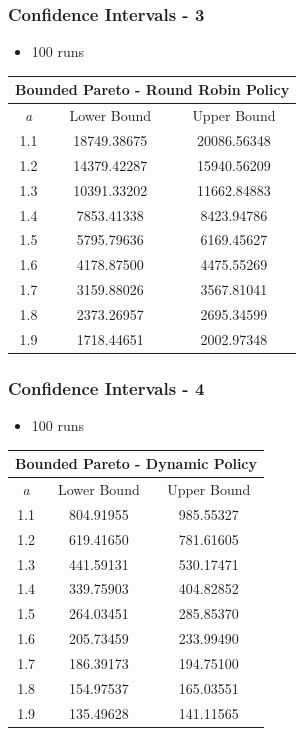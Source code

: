 \documentclass[red]{beamer}
\begin{document}
\begin{frame}
\frametitle{Confidence Intervals - 3}

\vspace{-.2cm}
\begin{itemize}
\item 100 runs
\end{itemize}
\vspace{.3cm}

\hspace*{1cm}
\begin{tabular}{|c|c|c|}
\hline
\multicolumn{3}{|c|}{Bounded Pareto - Round Robin Policy} \\
\hline
\textit{a} & Lower Bound & Upper Bound \\
\hline
1.1 & 18749.38675 & 20086.56348 \\
\hline
1.2 & 14379.42287 & 15940.56209 \\
\hline
1.3 & 10391.33202 & 11662.84883 \\
\hline
1.4 & 7853.41338	 & 8423.94786 \\
\hline
1.5 & 5795.79636	 & 6169.45627 \\
\hline
1.6 & 4178.87500	 & 4475.55269 \\
\hline
1.7 & 3159.88026	 & 3567.81041 \\
\hline
1.8 & 2373.26957	 & 2695.34599 \\
\hline
1.9 & 1718.44651	 & 2002.97348 \\
\hline
\end{tabular}
\end{frame}

\begin{frame}
\frametitle{Confidence Intervals - 4}

\vspace{-.2cm}
\begin{itemize}
\item 100 runs
\end{itemize}
\vspace{.3cm}

\hspace*{1cm}
\begin{tabular}{|c|c|c|}
\hline
\multicolumn{3}{|c|}{Bounded Pareto - Dynamic Policy} \\
\hline
\textit{a} & Lower Bound & Upper Bound \\
\hline
1.1 & 804.91955	& 985.55327 \\
\hline
1.2 & 619.41650	& 781.61605 \\
\hline
1.3 & 441.59131	& 530.17471 \\
\hline
1.4 & 339.75903	& 404.82852 \\
\hline
1.5 & 264.03451	& 285.85370 \\
\hline
1.6 & 205.73459	& 233.99490 \\
\hline
1.7 & 186.39173	& 194.75100 \\
\hline
1.8 & 154.97537	& 165.03551 \\
\hline
1.9 & 135.49628	& 141.11565 \\
\hline
\end{tabular}
\end{frame}
\end{document}
